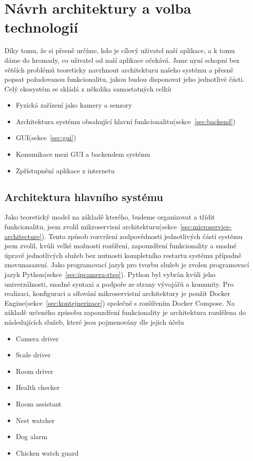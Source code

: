 \section{Návrh architektury a volba technologií}\label{sec:navrh-architektury-a-volba-technologii}
Díky tomu, že si přesně určíme, kdo je cílový uživatel naší aplikace, a k tomu dáme do hromady, co uživatel od naší aplikace očekává.
Jsme nyní schopni bez větších problémů teoreticky navrhnout architekturu našeho systému a přesně popsat požadovanou funkcionalitu, jakou budou disponovat jeho jednotlivé části.
Celý ekosystém se skládá z několika samostatných celků
\begin{itemize}
    \item Fyzická zařízení jako kamery a senzory
    \item Architektura systému obsahující hlavní funkcionalitu(sekce~\ref{sec:backend})
    \item GUI(sekce~\ref{sec:gui})
    \item Komunikace mezi GUI a backendem systému
    \item Zpřístupnění aplikace z internetu
\end{itemize}

\subsection{Architektura hlavního systému}\label{subsec:microservices}
Jako teoretický model na základě kterého, budeme organizovat a třídit funkcionalitu, jsem zvolil mikroservisní architekturu(sekce~\ref{sec:microservice-architecture}).
Tento způsob rozvržení zodpovědnosti jednotlivých částí systému jsem zvolil, kvůli velké možnosti rozšíření, zapouzdření funkcionality a snadné úpravě jednotlivých služeb bez nutnosti kompletního restartu systému případně znovunasazení.
Jako programovací jazyk pro tvorbu služeb je zvolen programovací jazyk Python(sekce~\ref{sec:ipcamera-rtsp}).
Python byl vybrán kvůli jeho univerzálnosti, snadné syntaxi a podpoře ze strany vývojářů a komunity.
Pro realizaci, konfiguraci a síťování mikroservistní architektury je použit Docker Engine(sekce~\ref{sec:kontejnerizace}) společně s rozšířením Docker Compose.
Na základě určeného způsobu zapouzdření funkcionality je architektura rozdělena do následujících služeb, které jsou pojmenovány dle jejich účelu
\begin{itemize}
    \item Camera driver
    \item Scale driver
    \item Room driver
    \item Health checker
    \item Room assistant
    \item Nest watcher
    \item Dog alarm
    \item Chicken watch guard
\end{itemize}

